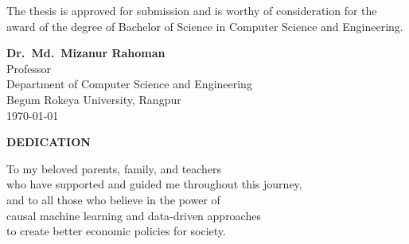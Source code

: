 The thesis is approved for submission and is worthy of consideration for the award of the degree of Bachelor of Science in Computer Science and Engineering.

\vspace{3cm}

\begin{flushright}
    \textbf{Dr.\ Md.\ Mizanur Rahoman}\\
    Professor\\
    Department of Computer Science and Engineering\\
    Begum Rokeya University, Rangpur\\
    \today
\end{flushright}

\newpage
\thispagestyle{empty}
\vspace*{4cm}

\begin{center}
    {\Large\bfseries DEDICATION}
\end{center}

\vspace{2cm}

\begin{center}
    To my beloved parents, family, and teachers\\
    who have supported and guided me throughout this journey,\\
    and to all those who believe in the power of\\
    causal machine learning and data-driven approaches\\
    to create better economic policies for society.
\end{center}    

\newpage